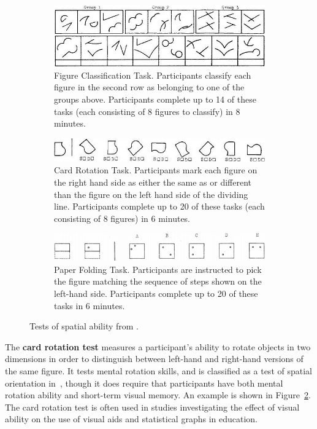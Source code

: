 \documentclass[11pt]{isuthesis}\usepackage[]{graphicx}\usepackage[]{color}
\begin{document}
\begin{figure}[ht]
  \centering
  \begin{subfigure}[b]{.75\linewidth}
  \includegraphics[width=\linewidth]{figureclassification}
  \caption[Figure Classification Task]{Figure Classification Task. Participants classify each figure in the second row as belonging to one of the groups above. Participants complete up to 14 of these tasks (each consisting of 8 figures to classify) in 8 minutes.\label{fig:figureclassification}}
  \end{subfigure}
  \begin{subfigure}[b]{.75\linewidth}
  \includegraphics[width=\linewidth]{cardrotation}
  \caption[Card Rotation Task]{Card Rotation Task. Participants mark each figure on the right hand side as either the same as or different than the figure on the left hand side of the dividing line. Participants complete up to 20 of these tasks (each consisting of 8 figures) in 6 minutes.\label{fig:cardrotation}}
  \end{subfigure}
  \begin{subfigure}[b]{.75\linewidth}
  \includegraphics[width=\linewidth]{paperfolding}
  \caption[Paper Folding Task]{Paper Folding Task. Participants are instructed to pick the figure matching the sequence of steps shown on the left-hand side. Participants  complete up to 20 of these tasks in 6 minutes.\label{fig:paperfolding}}
  \end{subfigure}
  \caption[Tests of spatial ability]{Tests of spatial ability from \protect\citet{ekstrom1976manual}.}   \label{fig:tests}
\end{figure}
  
The \textbf{card rotation test} measures a participant's ability to rotate objects in two dimensions in order to distinguish between left-hand and right-hand versions of the same figure. It tests mental rotation skills, and is classified as a test of spatial orientation in~\citep{ekstrom1976manual}, though it does require that participants have both mental rotation ability and short-term visual memory. An example is shown in Figure~\ref{fig:cardrotation}. 
The card rotation test is often used in studies investigating the effect of visual ability on the use of visual aids \citep{mayer1994whom} and statistical graphs \citep{lowrie2007solving} in education.
\end{document}
